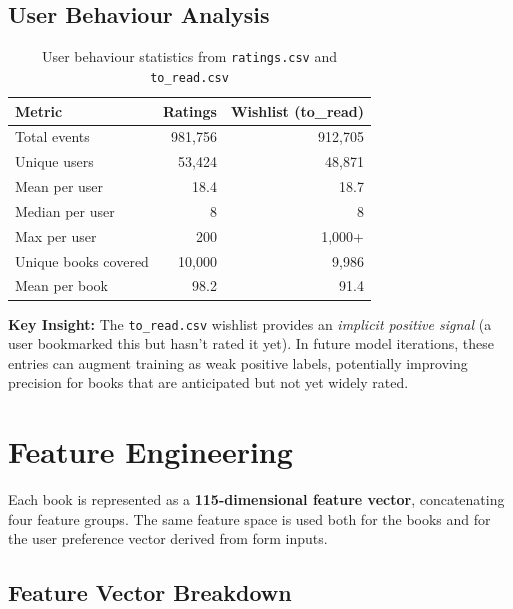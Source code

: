 \documentclass[12pt, a4paper]{article}
\newcommand{\code}[1]{\texttt{\small\color{shelfPurple}#1}}
\begin{document}
\subsection{User Behaviour Analysis}

\begin{table}[H]
\centering
\caption{User behaviour statistics from \code{ratings.csv} and \code{to\_read.csv}}
\begin{tabular}{@{}lrr@{}}
\toprule
\textbf{Metric} & \textbf{Ratings} & \textbf{Wishlist (to\_read)} \\
\midrule
Total events & 981{,}756 & 912{,}705 \\
Unique users & 53{,}424 & 48{,}871 \\
Mean per user & 18.4 & 18.7 \\
Median per user & 8 & 8 \\
Max per user & 200 & 1{,}000+ \\
\midrule
Unique books covered & 10{,}000 & 9{,}986 \\
Mean per book & 98.2 & 91.4 \\
\bottomrule
\end{tabular}
\end{table}

\begin{insightbox}
\textbf{Key Insight:} The \code{to\_read.csv} wishlist provides an \emph{implicit
positive signal} (a user bookmarked this but hasn't rated it yet). In future model
iterations, these entries can augment training as weak positive labels, potentially
improving precision for books that are anticipated but not yet widely rated.
\end{insightbox}

\section{Feature Engineering}

Each book is represented as a \textbf{115-dimensional feature vector},
concatenating four feature groups. The same feature space is used both
for the books and for the user preference vector derived from form inputs.

\subsection{Feature Vector Breakdown}
\end{document}
